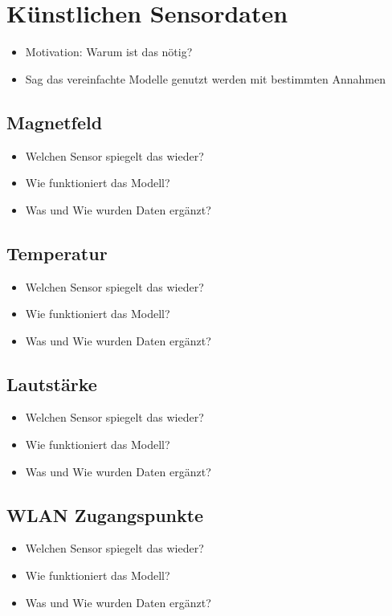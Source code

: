 \section{Künstlichen Sensordaten}
\begin{itemize}
    \item Motivation: Warum ist das nötig?
    \item Sag das vereinfachte Modelle genutzt werden mit bestimmten Annahmen
\end{itemize}

\subsection{Magnetfeld}
\begin{itemize}
    \item Welchen Sensor spiegelt das wieder?
    \item Wie funktioniert das Modell?
    \item Was und Wie wurden Daten ergänzt?
\end{itemize}

\subsection{Temperatur}
\begin{itemize}
    \item Welchen Sensor spiegelt das wieder?
    \item Wie funktioniert das Modell?
    \item Was und Wie wurden Daten ergänzt?
\end{itemize}

\subsection{Lautstärke}
\begin{itemize}
    \item Welchen Sensor spiegelt das wieder?
    \item Wie funktioniert das Modell?
    \item Was und Wie wurden Daten ergänzt?
\end{itemize}

\subsection{WLAN Zugangspunkte}
\begin{itemize}
    \item Welchen Sensor spiegelt das wieder?
    \item Wie funktioniert das Modell?
    \item Was und Wie wurden Daten ergänzt?
\end{itemize}